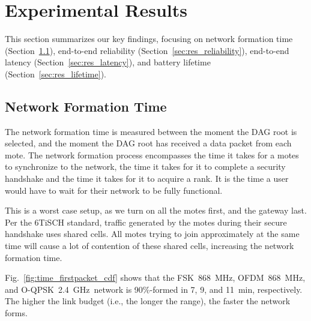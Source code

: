 \documentclass[sensors,article,submit,moreauthors,pdftex]{Definitions/mdpi}
\newcommand{\fsk}           {FSK~868~MHz}
\newcommand{\oqpsk}         {O-QPSK~2.4~GHz}
\newcommand{\ofdm}          {OFDM~868~MHz}
\begin{document}
\section{Experimental Results}
\label{sec:results}

This section summarizes our key findings, focusing on
    network formation time (Section~\ref{sec:res_formation}),
    end-to-end reliability (Section~\ref{sec:res_reliability}),
    end-to-end latency (Section~\ref{sec:res_latency}), and
    battery lifetime (Section~\ref{sec:res_lifetime}).

\subsection{Network Formation Time}
\label{sec:res_formation}


The network formation time is measured between the moment the DAG root is selected, and the moment the DAG root has received a data packet from each mote.
The network formation process encompasses
    the time it takes for a motes to synchronize to the network,
    the time it takes for it to complete a security handshake and
    the time it takes for it to acquire a rank.
It is the time a user would have to wait for their network to be fully functional.


This is a worst case setup, as we turn on all the motes first, and the gateway last.
Per the 6TiSCH standard, traffic generated by the motes during their secure handshake uses shared cells.
All motes trying to join approximately at the same time will cause a lot of contention of these shared cells, increasing the network formation time.


Fig.~\ref{fig:time_firstpacket_cdf} shows that the \fsk, \ofdm , and \oqpsk\ network is 90\%-formed in 7, 9, and 11~min, respectively.
The higher the link budget (i.e., the longer the range), the faster the network forms.
\end{document}
